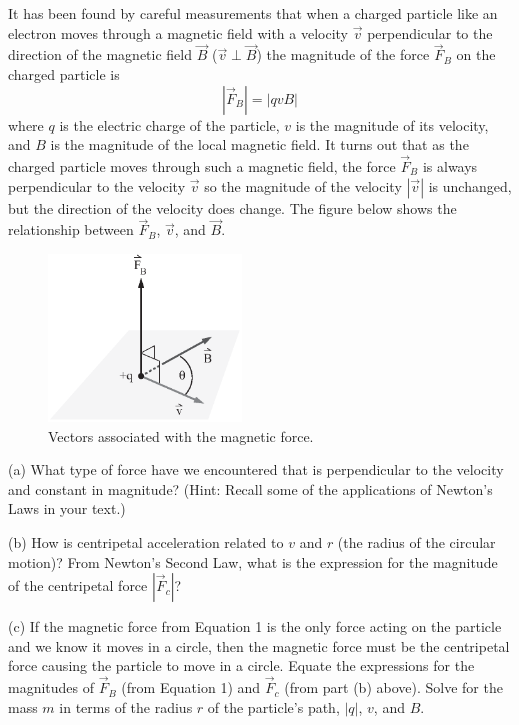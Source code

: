 It has been found by careful measurements that when a charged particle like an electron moves through a magnetic
field with a velocity $\vec v$ perpendicular to the direction of the magnetic field $\vec B$ ($\vec v \perp \vec B$) 
the magnitude of the force $\vec F_B$ on the charged particle is
\begin{equation}
|\vec F_B| = |q v B|
\end{equation}
where $q$ is the electric charge of the particle, $v$ is the magnitude of its velocity,
and $B$ is the magnitude of the local magnetic field.
It turns out that as the charged particle moves through such a magnetic field, the force $\vec F_B$ is always perpendicular
to the velocity $\vec v$ so the magnitude of the velocity $|\vec v|$ is unchanged, but the direction of the velocity does change.
The figure below shows the relationship between $\vec F_B$, $\vec v$,
and $\vec B$.
\vspace{5mm}

\begin{figure}[h!]
\begin{center}
\includegraphics[height=1.75in]{eoverm2/vCrossB_bw.eps}
\caption{Vectors associated with the magnetic force. \hfill}
\end{center}
\end{figure}

(a) What type of force have we encountered 
that is perpendicular to the velocity and constant in magnitude?
(Hint: Recall some of the applications of Newton's Laws in your text.)
\vspace{15mm}

(b) How is centripetal acceleration related to $v$ and $r$ (the radius of the
circular motion)? From Newton's Second Law, what is the expression for the magnitude of
the centripetal force $|\vec F_c|$?
\vspace{15mm}

(c) If the magnetic force from Equation 1 is the only force acting on the particle and we know it moves in a circle, then the magnetic force must be the centripetal force causing the particle to move in a circle.  Equate the expressions for the magnitudes of $\vec F_B$ (from Equation 1) and
$\vec F_c$ (from part (b) above).
Solve for the mass $m$ in terms of the radius $r$ of the particle's path,
$|q|$, $v$, and $B$.
\vspace{45mm}


